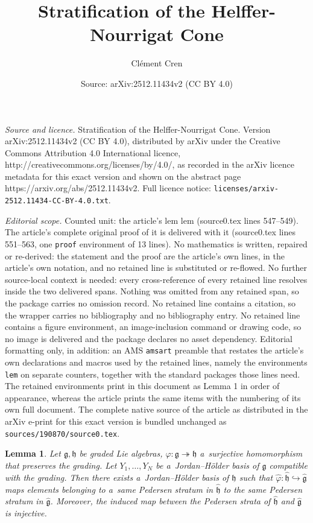 \documentclass[10pt,a4paper]{amsart}
\title{Stratification of the Helffer-Nourrigat Cone}
\author{Cl\'ement Cren}
\date{Source: arXiv:2512.11434v2 (CC BY 4.0)}
\newtheorem{lem}{Lemma}
\newcommand{\g}{\mathfrak{g}} %
\begin{document}
\maketitle

\noindent\emph{Source and licence.} Stratification of the Helffer-Nourrigat Cone. Version arXiv:2512.11434v2 (CC BY 4.0), distributed by arXiv under the Creative Commons Attribution 4.0 International licence, http://creativecommons.org/licenses/by/4.0/, as recorded in the arXiv licence metadata for this exact version and shown on the abstract page https://arxiv.org/abs/2512.11434v2. Full licence notice: \texttt{licenses/arxiv-2512.11434-CC-BY-4.0.txt}.\par\smallskip

\noindent\textit{Editorial scope.} Counted unit: the article's lem lem (source0.tex lines 547--549). The article's complete original proof of it is delivered with it (source0.tex lines 551--563, one \texttt{proof} environment of 13 lines). No mathematics is written, repaired or re-derived: the statement and the proof are the article's own lines, in the article's own notation, and no retained line is substituted or re-flowed.  No further source-local context is needed: every cross-reference of every retained line resolves inside the two delivered spans.  Nothing was omitted from any retained span, so the package carries no omission record.  No retained line contains a citation, so the wrapper carries no bibliography and no bibliography entry.  No retained line contains a figure environment, an image-inclusion command or drawing code, so no image is delivered and the package declares no asset dependency.  Editorial formatting only, in addition: an AMS \texttt{amsart} preamble that restates the article's own declarations and macros used by the retained lines, namely the environments \texttt{lem} on separate counters, together with the standard packages those lines need.  The retained environments print in this document as Lemma 1 in order of appearance, whereas the article prints the same items with the numbering of its own full document.  The complete native source of the article as distributed in the arXiv e-print for this exact version is bundled unchanged as \texttt{sources/190870/source0.tex}.
\begin{lem}
 Let $\g,\mathfrak{h}$ be graded Lie algebras, $\varphi\colon \g\twoheadrightarrow\mathfrak{h}$ a~surjective homomorphism that preserves the grading. Let $Y_1, \dots, Y_N$ be a~Jordan--H\"older basis of $\g$ compatible with the grading. Then there exists a~Jordan--H\"older basis of $\mathfrak{h}$ such that $\widehat{\varphi} \colon \widehat{\mathfrak{h}} \hookrightarrow \widehat{\g}$ maps elements belonging to a~same Pedersen stratum in $\widehat{\mathfrak{h}}$ to the same Pedersen stratum in $\widehat{\g}$. Moreover, the induced map between the Pedersen strata of $\widehat{\mathfrak{h}}$ and $\widehat{\g}$ is injective.
\end{lem}
\end{document}
